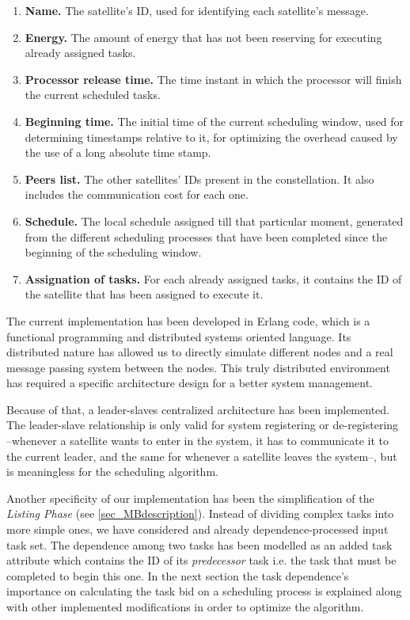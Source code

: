 \begin{enumerate}
\item \textbf{Name. } The satellite's ID, used for identifying each satellite's message.
\item \textbf{Energy. } The amount of energy that has not been reserving for executing already assigned tasks.
\item \textbf{Processor release time. } The time instant in which the processor will finish the current scheduled tasks.
\item \textbf{Beginning time. } The initial time of the current scheduling window, used for determining timestamps relative to it, for optimizing the overhead caused by the use of a long absolute time stamp.
\item \textbf{Peers list. } The other satellites' IDs present in the constellation. It also includes the communication cost for each one.
\item \textbf{Schedule. } The local schedule assigned till that particular moment, generated from the different scheduling processes that have been completed since the beginning of the scheduling window.
\item \textbf{Assignation of tasks. } For each already assigned tasks, it contains the ID of the satellite that has been assigned to execute it.
\end{enumerate}

The current implementation has been developed in Erlang code, which is a functional programming and distributed systems oriented language. Its distributed nature has allowed us to directly simulate different nodes and a real message passing system between the nodes. This truly distributed environment has required a specific architecture design for a better system management.

Because of that, a leader-slaves centralized architecture has been implemented. The leader-slave relationship is only valid for system registering or de-registering --whenever a satellite wants to enter in the system, it has to communicate it to the current leader, and the same for whenever a satellite leaves the system--, but is meaningless for the scheduling algorithm.

Another specificity of our implementation has been the simplification of the \emph{Listing Phase} (see \ref{sec_MBdescription}). Instead of dividing complex tasks into more simple ones, we have considered and already dependence-processed input task set. The dependence among two tasks has been modelled as an added task attribute which contains the ID of its \emph{predecessor} task i.e. the task that must be completed to begin this one. In the next section the task dependence's importance on calculating the task bid on a scheduling process is explained along with other implemented modifications in order to optimize the algorithm.

